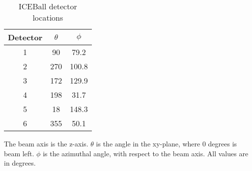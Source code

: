 \begin{table}[]
    \centering
    \caption{ICEBall detector locations }
    \begin{tabular}{c|c|c} \toprule
         Detector & $\theta$ & $\phi$  \\
         \hline
         1 & 90 & 79.2 \\ 
         2 & 270 & 100.8\\
         3 & 172 & 129.9\\
         4 & 198 & 31.7\\
         5 & 18 & 148.3\\
         6 & 355 & 50.1\\ \bottomrule
    \end{tabular}
    \footnotesize
    \item The beam axis is the z-axis. $\theta$ is the angle in the xy-plane, where 0 degrees is beam left. $\phi$ is the azimuthal angle, with respect to the beam axis. All values are in degrees.
    \label{tab:ICE_Det_Loc}
\end{table}